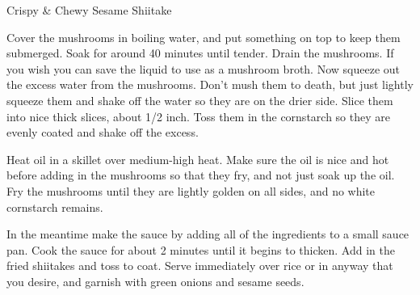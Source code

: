 \begin{recipe}[\vegan]{Crispy \& Chewy Sesame Shiitake}

    \begin{ingredients}
    \end{ingredients}

    \begin{instructions}
        Cover the mushrooms in boiling water, and put something on top to keep them submerged. Soak for around 40 minutes until tender. Drain the mushrooms. If you wish you can save the liquid to use as a mushroom broth. Now squeeze out the excess water from the mushrooms. Don’t mush them to death, but just lightly squeeze them and shake off the water so they are on the drier side. Slice them into nice thick slices, about 1/2 inch. Toss them in the cornstarch so they are evenly coated and shake off the excess.

        Heat oil in a skillet over medium-high heat. Make sure the oil is nice and hot before adding in the mushrooms so that they fry, and not just soak up the oil. Fry the mushrooms until they are lightly golden on all sides, and no white cornstarch remains.

        In the meantime make the sauce by adding all of the ingredients to a small sauce pan. Cook the sauce for about 2 minutes until it begins to thicken. Add in the fried shiitakes and toss to coat. Serve immediately over rice or in anyway that you desire, and garnish with green onions and sesame seeds.
    \end{instructions}
\end{recipe}
